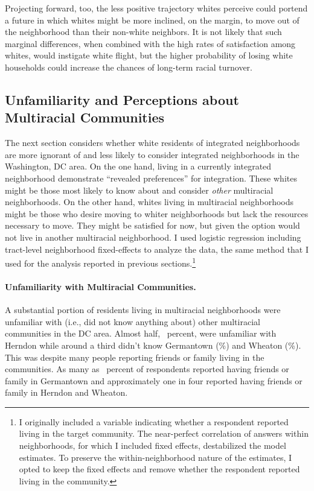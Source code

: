 \documentclass{baderart}
\begin{document}
Projecting forward, too, the less positive trajectory whites perceive could portend a future in which whites might be more inclined, on the margin, to move out of the neighborhood than their non-white neighbors. It is not likely that such marginal differences, when combined with the high rates of satisfaction among whites, would instigate white flight, but the higher probability of losing white households could increase the chances of long-term racial turnover. 

\subsection{Unfamiliarity and Perceptions about Multiracial Communities}

The next section considers whether white residents of integrated neighborhoods are more ignorant of and less likely to consider integrated neighborhoods in the Washington, DC area. On the one hand, living in a currently integrated neighborhood demonstrate ``revealed preferences'' for integration. These whites might be those most likely to know about and consider \emph{other} multiracial neighborhoods. On the other hand, whites living in multiracial neighborhoods might be those who desire moving to whiter neighborhoods but lack the resources necessary to move. They might be satisfied for now, but given the option would not live in another multiracial neighborhood. I used logistic regression including tract-level neighborhood fixed-effects to analyze the data, the same method that I used for the analysis reported in previous sections.\footnote{I originally included a variable indicating whether a respondent reported living in the target community. The near-perfect correlation of answers within neighborhoods, for which I included fixed effects, destabilized the model estimates. To preserve the within-neighborhood nature of the estimates, I opted to keep the fixed effects and remove whether the respondent reported living in the community.}

\paragraph{Unfamiliarity with Multiracial Communities.}\label{unfamiliarity-with-multiracial-communities}

A substantial portion of residents living in multiracial neighborhoods were unfamiliar with (i.e., did not know anything about) other multiracial communities in the DC area. Almost half, \dkherndon~percent, were unfamiliar with Herndon while around a third didn't know Germantown (\dkgermantown\%) and Wheaton (\dkwheaton\%). This was despite many people reporting friends or family living in the communities. As many as \ffgermantown~percent of respondents reported having friends or family in Germantown and approximately one in four reported having friends or family in Herndon and Wheaton.
\end{document}
